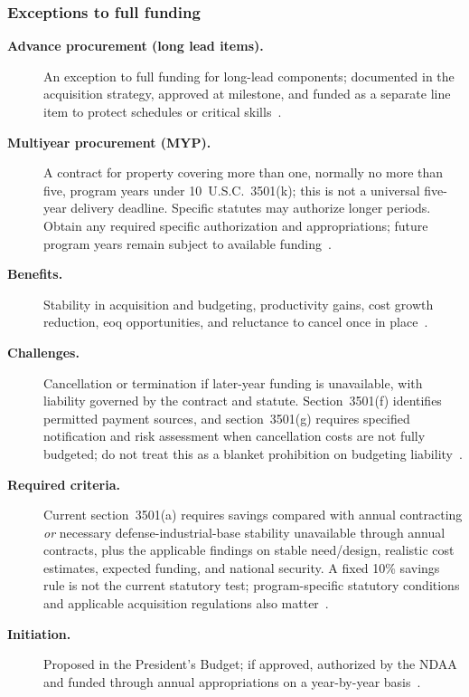 \documentclass[../main.tex]{subfiles}
\begin{document}

\subsubsection{Exceptions to full funding}
\begin{description}
  \item[\textbf{Advance procurement (long lead items).}] An exception to full funding for long-lead components; documented in the acquisition strategy, approved at milestone, and funded as a separate line item to protect schedules or critical skills~\autocite{edo-3-1-3-program-funding-2025,DoDFMR-Vol2A-Ch1}.
\end{description}

\begin{description}
  \item[\textbf{Multiyear procurement (MYP).}] A contract for property covering more than one, normally no more than five, program years under 10~U.S.C.\ 3501(k); this is not a universal five-year delivery deadline. Specific statutes may authorize longer periods. Obtain any required specific authorization and appropriations; future program years remain subject to available funding~\autocite{USC-3501,DFARS217-172}.
  \item[\textbf{Benefits.}] Stability in acquisition and budgeting, productivity gains, cost growth reduction, \ac{eoq} opportunities, and reluctance to cancel once in place~\autocite{edo-3-1-3-program-funding-2025}.
  \item[\textbf{Challenges.}] Cancellation or termination if later-year funding is unavailable, with liability governed by the contract and statute. Section~3501(f) identifies permitted payment sources, and section~3501(g) requires specified notification and risk assessment when cancellation costs are not fully budgeted; do not treat this as a blanket prohibition on budgeting liability~\autocite{USC-3501,DFARS217-172}.
  \item[\textbf{Required criteria.}] Current section~3501(a) requires savings compared with annual contracting \emph{or} necessary defense-industrial-base stability unavailable through annual contracts, plus the applicable findings on stable need/design, realistic cost estimates, expected funding, and national security. A fixed 10\% savings rule is not the current statutory test; program-specific statutory conditions and applicable acquisition regulations also matter~\autocite{USC-3501,DFARS217-172}.
  \item[\textbf{Initiation.}] Proposed in the President's Budget; if approved, authorized by the NDAA and funded through annual appropriations on a year-by-year basis~\autocite{edo-3-1-3-program-funding-2025}.
\end{description}
\end{document}
